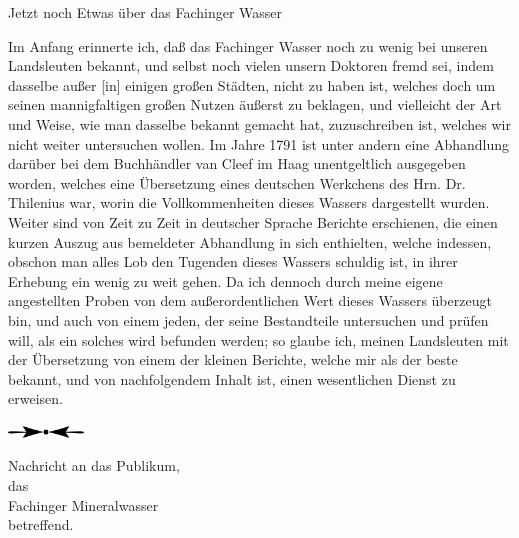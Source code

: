 \documentclass[fontsize=11pt,a5paper,twoside]{memoir}
\begin{document}

\newpage

\begin{center}
\Large Jetzt noch Etwas über das Fachinger Wasser\par
\end{center}

Im Anfang erinnerte ich,
daß das Fachinger Wasser noch zu wenig bei unseren Landsleuten bekannt,
und selbst noch vielen unsern Doktoren fremd sei,
indem dasselbe außer [in] einigen großen Städten, nicht zu haben ist,
welches doch um seinen mannigfaltigen großen Nutzen äußerst zu beklagen,
und vielleicht der Art und Weise,
wie man dasselbe bekannt gemacht hat,
zuzuschreiben ist, welches wir nicht weiter untersuchen wollen.
Im Jahre 1791 ist unter andern eine Abhandlung darüber
bei dem Buchhändler van Cleef im Haag%
unentgeltlich ausgegeben worden,
welches eine Übersetzung eines deutschen Werkchens
des Hrn. Dr. Thilenius war,
worin die Vollkommenheiten dieses Wassers dargestellt wurden.
Weiter sind von Zeit zu Zeit in deutscher Sprache Berichte erschienen,
die einen kurzen Auszug aus bemeldeter Abhandlung in sich enthielten,
welche indessen,
obschon man alles Lob den Tugenden dieses Wassers schuldig ist,
in ihrer Erhebung ein wenig zu weit gehen.
Da ich dennoch durch meine eigene angestellten Proben
von dem außerordentlichen Wert dieses Wassers überzeugt bin,
und auch von einem jeden,
der seine Bestandteile untersuchen und prüfen will,
als ein solches wird befunden werden;
so glaube ich,
meinen Landsleuten mit der Übersetzung von einem der kleinen Berichte,
welche mir als der beste bekannt,
und von nachfolgendem Inhalt ist,
einen wesentlichen Dienst zu erweisen.

\vfill
\begin{center}
\includegraphics[width=2cm]{figures/div1}
\end{center}
\vfill

\newpage
\fancyhead[C]{=\kern-0.14em=\kern-0.14em=\kern-0.14em=\kern-0.14em= \thepage\kern+0.14em =\kern-0.14em=\kern-0.14em=\kern-0.14em=\kern-0.14em=}
{\centering
    {\Large Nachricht an das Publikum,}\\
    {\small das}\\
    \vspace{.5em}
    {\LARGE Fachinger Mineralwasser}\\
    {\small betreffend.}\\

    \begin{center}\begin{minipage}{4cm}
      \centering
      \hrulefill\\
    \end{minipage}\end{center}
}
\end{document}
